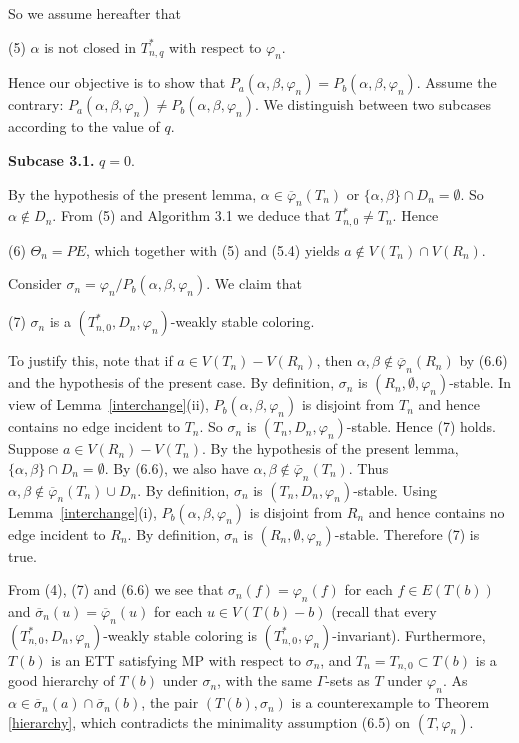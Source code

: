 \documentclass[11pt]{article}
\newcommand{\phibar}{\overline{\varphi}}
\begin{document}
So we assume hereafter that 

(5) $\alpha$ is not closed in $T_{n,q}^*$ with respect to $\varphi_n$. 

Hence our objective is to show that $P_{a}(\alpha,\beta,\varphi_n)=P_{b}(\alpha,\beta,\varphi_n)$. Assume the contrary: $P_{a}(\alpha,\beta,\varphi_n)\ne P_{b}(\alpha,\beta,\varphi_n)$. We distinguish between two subcases according to 
the value of $q$.

{\bf Subcase 3.1.} $q=0$. 

By the hypothesis of the present lemma, $\alpha\in \phibar_n(T_{n})$ or $\{\alpha, \beta\} \cap D_{n}=\emptyset$.
So $\alpha\notin D_n$. From (5) and Algorithm 3.1 we deduce that $T_{n,0}^* \ne T_n$. Hence

(6) $\Theta_n=PE$, which together with (5) and (5.4) yields $a \notin V(T_n)\cap V(R_n)$.

Consider $\sigma_n=\varphi_n/P_{b}(\alpha,\beta,\varphi_n)$. We claim that

(7) $\sigma_n$ is a $(T_{n,0}^*, D_n,\varphi_n)$-weakly stable coloring. 

To justify this, note that if $a\in V(T_n)-V(R_n)$, then $\alpha,\beta\notin \phibar_n (R_n)$ by (6.6) and the 
hypothesis of the present case. By definition, $\sigma_n$ is $(R_n,\emptyset,\varphi_n)$-stable. In view of Lemma~\ref{interchange}(ii), $P_{b}(\alpha,\beta,\varphi_n)$ is disjoint from $T_n$ and hence contains no edge 
incident to $T_n$. So $\sigma_n$ is $(T_n,D_n,\varphi_n)$-stable. Hence (7) holds.   Suppose $a\in V(R_n)-V(T_n)$. 
By the hypothesis of the present lemma, $\{\alpha, \beta\} \cap D_{n}=\emptyset$. By (6.6), we also have 
$\alpha,\beta\notin \phibar_n(T_n)$. Thus $\alpha,\beta\notin \phibar_n(T_n) \cup D_n$.  By definition,
$\sigma_n$ is $(T_n,D_n,\varphi_n)$-stable. Using Lemma~\ref{interchange}(i), $P_{b}(\alpha,\beta,\varphi_n)$ 
is disjoint from $R_n$ and hence contains no edge incident to $R_n$. By definition, $\sigma_n$ is $(R_n,\emptyset,
\varphi_n)$-stable. Therefore (7) is true.

From (4), (7) and (6.6) we see that $\sigma_n(f)=\varphi_n(f)$ for each $f\in E(T(b))$ and $\overline{\sigma}_n(u)=\phibar_n(u)$ for each $u\in V(T(b)-b)$ 
(recall that every $(T_{n,0}^*, D_n,\varphi_n)$-weakly stable coloring is $(T_{n,0}^*, \varphi_n)$-invariant). Furthermore, $T(b)$ is an ETT 
satisfying MP with respect to $\sigma_n$, and $T_n=T_{n,0} \subset T(b)$ is a good hierarchy of $T(b)$ under $\sigma_n$, 
with the same $\Gamma$-sets as $T$ under $\varphi_n$. As $\alpha\in\overline{\sigma}_n(a)\cap \overline{\sigma}_n(b)$, 
the pair $(T(b), \sigma_n)$ is a counterexample to Theorem \ref{hierarchy}, which contradicts the minimality assumption 
(6.5) on $(T, \varphi_n)$. 
\end{document}

